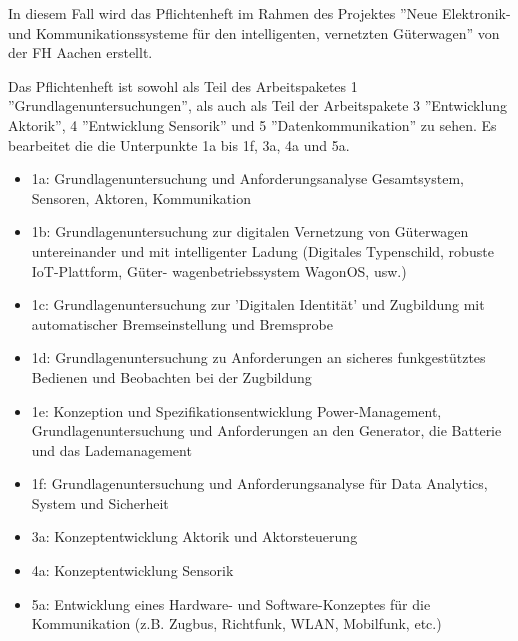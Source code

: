 In diesem Fall wird das Pflichtenheft im Rahmen des Projektes ''Neue Elektronik- und Kommunikationssysteme für den intelligenten, vernetzten Güterwagen'' von der FH Aachen erstellt.\par
Das Pflichtenheft ist sowohl als Teil des Arbeitspaketes 1 ''Grundlagenuntersuchungen'', als auch als Teil der Arbeitspakete 3 ''Entwicklung Aktorik'', 4 ''Entwicklung Sensorik'' und 5 ''Datenkommunikation'' zu sehen. Es bearbeitet die die Unterpunkte 1a bis 1f, 3a, 4a und 5a.
\begin{itemize}
    \item 1a: Grundlagenuntersuchung und Anforderungsanalyse Gesamtsystem, Sensoren, Aktoren, Kommunikation
    \item 1b: Grundlagenuntersuchung zur digitalen Vernetzung von Güterwagen untereinander und mit intelligenter Ladung (Digitales Typenschild, robuste IoT-Plattform, Güter- wagenbetriebssystem WagonOS, usw.)
    \item 1c: Grundlagenuntersuchung zur 'Digitalen Identität' und Zugbildung mit automatischer Bremseinstellung und Bremsprobe
    \item 1d: Grundlagenuntersuchung zu Anforderungen an sicheres funkgestütztes Bedienen und Beobachten bei der Zugbildung
    \item 1e: Konzeption und Spezifikationsentwicklung Power-Management, Grundlagenuntersuchung und Anforderungen an den Generator, die Batterie und das Lademanagement
    \item 1f: Grundlagenuntersuchung und Anforderungsanalyse für Data Analytics, System und Sicherheit
    \item 3a: Konzeptentwicklung Aktorik und Aktorsteuerung
    \item 4a: Konzeptentwicklung Sensorik
    \item 5a: Entwicklung eines Hardware- und Software-Konzeptes für die Kommunikation (z.B. Zugbus, Richtfunk, WLAN, Mobilfunk, etc.)
\end{itemize}